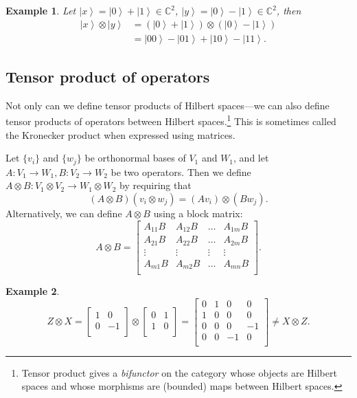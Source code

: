 \documentclass{article}
\newtheorem*{example}{Example}
\begin{document}
\begin{example}
	Let $\left| x \right\rangle = \left| 0 \right\rangle  + \left| 1 \right\rangle  \in \mathbb{C}^2$,  $\left| y \right\rangle  = \left| 0 \right\rangle  - \left| 1 \right\rangle  \in \mathbb{C}^2$, then
	\begin{align*}
		\left| x \right\rangle \otimes \left| y \right\rangle &= \left( \left| 0 \right\rangle  + \left| 1 \right\rangle  \right) \otimes \left( \left| 0 \right\rangle  - \left| 1 \right\rangle  \right)  \\
		&= \left| 00 \right\rangle - \left| 01 \right\rangle  + \left| 10 \right\rangle  - \left| 11 \right\rangle  
	.\end{align*}
\end{example}

\subsection{Tensor product of operators}
Not only can we define tensor products of Hilbert spaces---we can also define tensor products of operators between Hilbert spaces.\footnote{Tensor product gives a \emph{bifunctor} on the category whose objects are Hilbert spaces and whose morphisms are (bounded) maps between Hilbert spaces.}
This is sometimes called the Kronecker product when expressed using matrices.

Let $\{v_i\}$ and $\{w_j\}$ be orthonormal bases of $V_1$ and $W_1$, and let
$A: V_1 \to W_1, B: V_2 \to W_2$ be two operators.  Then we define $A \otimes B: V_1 \otimes V_2 \to W_1 \otimes W_2$ by requiring that
\[
	(A \otimes B) (v_i \otimes w_j) = (A v_i) \otimes (B w_j)
.\] 
Alternatively, we can define $A \otimes B$ using a block matrix:
\[
	A \otimes B = 
	\begin{bmatrix}
		A_{1 1}B & A_{1 2} B & \ldots & A_{1 m}B \\
		A_{2 1}B & A_{2 2}B & \ldots & A_{2 m}B \\
		\vdots & \vdots & \vdots & \vdots \\
		A_{m 1}B & A_{m 2}B & \ldots & A_{m n}B \\
	\end{bmatrix}
.\] 

\begin{example}
	\[
		Z \otimes X = 
		\begin{bmatrix}
			1 & 0 \\
			0 & -1 \\
		\end{bmatrix}
		\otimes 
		\begin{bmatrix}
			0 & 1 \\
			1 & 0 \\
		\end{bmatrix}
		=
		\begin{bmatrix}
			0 & 1 & 0 & 0 \\
			1 & 0 & 0 & 0 \\
			0 & 0 & 0 & -1 \\
			0 & 0 & -1 & 0 \\
		\end{bmatrix}
		\neq X \otimes Z
	.\] 
\end{example}
\end{document}
